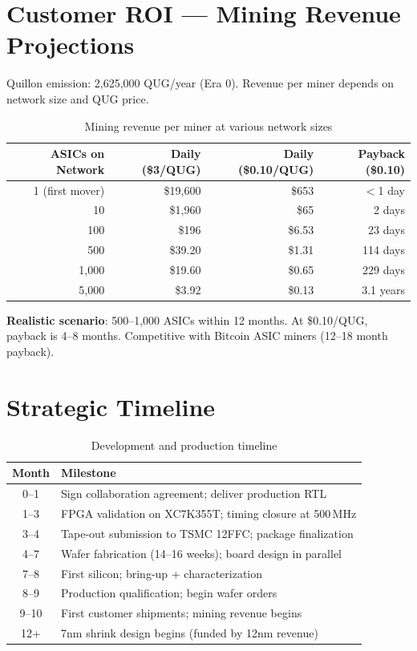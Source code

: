 \documentclass[11pt,a4paper]{article}
\begin{document}
\section{Customer ROI --- Mining Revenue Projections}

Quillon emission: 2,625,000 QUG/year (Era 0). Revenue per miner depends on network size and QUG price.

\begin{table}[h]
\centering
\begin{tabular}{rrrr}
\toprule
\textbf{ASICs on Network} & \textbf{Daily (\$3/QUG)} & \textbf{Daily (\$0.10/QUG)} & \textbf{Payback (\$0.10)} \\
\midrule
1 (first mover) & \$19,600 & \$653 & $<$1 day \\
10 & \$1,960 & \$65 & 2 days \\
100 & \$196 & \$6.53 & 23 days \\
500 & \$39.20 & \$1.31 & 114 days \\
1,000 & \$19.60 & \$0.65 & 229 days \\
5,000 & \$3.92 & \$0.13 & 3.1 years \\
\bottomrule
\end{tabular}
\caption{Mining revenue per miner at various network sizes}
\end{table}

\textbf{Realistic scenario}: 500--1,000 ASICs within 12 months. At \$0.10/QUG, payback is 4--8 months. Competitive with Bitcoin ASIC miners (12--18 month payback).

\section{Strategic Timeline}

\begin{table}[h]
\centering
\begin{tabular}{cl}
\toprule
\textbf{Month} & \textbf{Milestone} \\
\midrule
0--1 & Sign collaboration agreement; deliver production RTL \\
1--3 & FPGA validation on XC7K355T; timing closure at 500\,MHz \\
3--4 & Tape-out submission to TSMC 12FFC; package finalization \\
4--7 & Wafer fabrication (14--16 weeks); board design in parallel \\
7--8 & First silicon; bring-up + characterization \\
8--9 & Production qualification; begin wafer orders \\
9--10 & First customer shipments; mining revenue begins \\
12+ & 7nm shrink design begins (funded by 12nm revenue) \\
\bottomrule
\end{tabular}
\caption{Development and production timeline}
\end{table}
\end{document}
